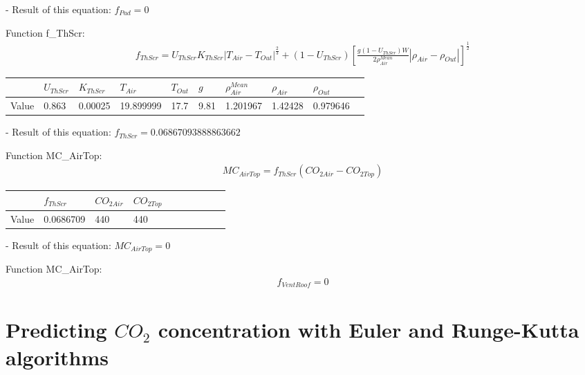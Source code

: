 \documentclass[a4paper]{article}
\begin{document}
- Result of this equation: \(f_{Pad} = 0\)

Function f\_ThScr:
\begin{align*}
  f_{ThScr} = U_{ThScr} K_{ThScr} |T_{Air} - T_{Out}| ^{\frac{2}{3}} + (1 - U_{ThScr}) {\left[\frac{g(1 - U_{ThScr})W}{2\rho^{Mean}_{Air}} |\rho_{Air} - \rho_{Out}|\right]}^{\frac{1}{2}}
\end{align*}

\begin{table}[H]
  \centering
  \begin{tabular}{|l|l|l|l|l|l|l|l|l|l|}
    \hline
          & $U_{ThScr}$ & $K_{ThScr}$ & $T_{Air}$ & $T_{Out}$ & $g$  & $\rho^{Mean}_{Air}$ & $\rho_{Air}$ & $\rho_{Out}$ \\
    \hline
    Value & 0.863       & 0.00025     & 19.899999 & 17.7      & 9.81 & 1.201967            & 1.42428      & 0.979646     \\
    \hline
  \end{tabular}
\end{table}

- Result of this equation: \(f_{ThScr} = 0.06867093888863662\)

Function MC\_AirTop:
\begin{align*}
  MC_{AirTop} = f_{ThScr} (CO_{2 Air} - CO_{2 Top})
\end{align*}

\begin{table}[H]
  \centering
  \begin{tabular}{|l|l|l|l|l|l|l|l|l|l|}
    \hline
          & $f_{ThScr}$ & $CO_{2 Air}$ & $CO_{2 Top}$ \\
    \hline
    Value & 0.0686709   & 440          & 440          \\
    \hline
  \end{tabular}
\end{table}

- Result of this equation: \(MC_{AirTop} = 0\)

Function MC\_AirTop:
\begin{align*}
  f_{VentRoof} = 0
\end{align*}



\newpage
\section{Predicting \(CO_2\) concentration with Euler and Runge-Kutta algorithms}
\end{document}
